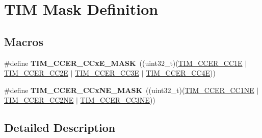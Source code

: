 \hypertarget{group___t_i_m___mask___definitions}{}\section{T\+IM Mask Definition}
\label{group___t_i_m___mask___definitions}
\subsection*{Macros}
\begin{DoxyCompactItemize}
\item 
\#define {\bfseries T\+I\+M\+\_\+\+C\+C\+E\+R\+\_\+\+C\+Cx\+E\+\_\+\+M\+A\+SK}~((uint32\+\_\+t)(\hyperlink{group___peripheral___registers___bits___definition_ga3f494b9881e7b97bb2d79f7ad4e79937}{T\+I\+M\+\_\+\+C\+C\+E\+R\+\_\+\+C\+C1E} $\vert$ \hyperlink{group___peripheral___registers___bits___definition_ga76392a4d63674cd0db0a55762458f16c}{T\+I\+M\+\_\+\+C\+C\+E\+R\+\_\+\+C\+C2E} $\vert$ \hyperlink{group___peripheral___registers___bits___definition_ga1da114e666b61f09cf25f50cdaa7f81f}{T\+I\+M\+\_\+\+C\+C\+E\+R\+\_\+\+C\+C3E} $\vert$ \hyperlink{group___peripheral___registers___bits___definition_ga940b041ab5975311f42f26d314a4b621}{T\+I\+M\+\_\+\+C\+C\+E\+R\+\_\+\+C\+C4E}))\hypertarget{group___t_i_m___mask___definitions_ga5d1a1d755cda12637dfa5143130b4891}{}\label{group___t_i_m___mask___definitions_ga5d1a1d755cda12637dfa5143130b4891}

\item 
\#define {\bfseries T\+I\+M\+\_\+\+C\+C\+E\+R\+\_\+\+C\+Cx\+N\+E\+\_\+\+M\+A\+SK}~((uint32\+\_\+t)(\hyperlink{group___peripheral___registers___bits___definition_ga813056b3f90a13c4432aeba55f28957e}{T\+I\+M\+\_\+\+C\+C\+E\+R\+\_\+\+C\+C1\+NE} $\vert$ \hyperlink{group___peripheral___registers___bits___definition_ga6a784649120eddec31998f34323d4156}{T\+I\+M\+\_\+\+C\+C\+E\+R\+\_\+\+C\+C2\+NE} $\vert$ \hyperlink{group___peripheral___registers___bits___definition_gad46cce61d3bd83b64257ba75e54ee1aa}{T\+I\+M\+\_\+\+C\+C\+E\+R\+\_\+\+C\+C3\+NE}))\hypertarget{group___t_i_m___mask___definitions_gaeae61652a005098f9fe6b398d29d4279}{}\label{group___t_i_m___mask___definitions_gaeae61652a005098f9fe6b398d29d4279}

\end{DoxyCompactItemize}


\subsection{Detailed Description}
